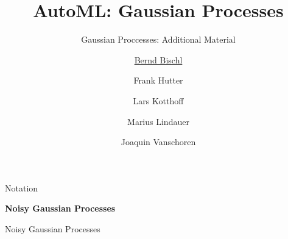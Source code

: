 



\newcommand{\lz}{\vspace{0.5cm}}
\newcommand{\thetab}{\bm{\weights}}
\newcommand{\zero}{\mathbf{0}}
\newcommand{\Xmat}{\mathbf{X}}
\newcommand{\ydat}{\mathbf{y}}
\newcommand{\id}{\boldsymbol{I}}
\newcommand{\Amat}{\mathbf{A}}
\newcommand{\Xspace}{\mathcal{X}}                                           
\newcommand{\Yspace}{\mathcal{Y}}
\newcommand{\ls}{\ell}
\newcommand{\natnum}{\mathbb{N}}
\newcommand{\intnum}{\mathbb{Z}}

\usepackage{fontawesome}
\usepackage{dirtytalk}
\usepackage{csquotes}



\title[AutoML: GPs]{AutoML: Gaussian Processes} %
\subtitle{Gaussian Proccesses: Additional Material} %
\author[Marius Lindauer]{\underline{Bernd Bischl} \and Frank Hutter \and Lars Kotthoff\newline \and Marius Lindauer \and Joaquin Vanschoren}
\institute{}
\date{}




\maketitle

\begin{frame}[c]{Notation}



\end{frame}


\begin{frame}[c]{}
\centering
\huge
\textbf{Noisy Gaussian Processes}
\end{frame}


\begin{frame}[c]{Noisy Gaussian Processes}



\end{frame}

